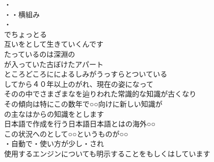 
・\\

・・横組み\\

・\\
\santen%
\santen%
でちょっとる\\

互いをとして生きていくんです\\
たっているのは深淵の\\

が入っていた古ぼけたアパート\\
ところどころにによるしみがうっすらとついている\\

してから４０年以上のがれ、現在の姿になって\\
そのの中でさまざまなを辿り\santen{}われた常識的な知識が古くなり\\
その傾向は特にこの数年で\santen{}○○向けに新しい知識が\\
の主なは\santen{}からの知識\santen{}をとします\\
日本語で作成を行う日本語\santen{}日本語とはの海外○○\\
{}この状況へのとして○○というものが○○\\
・自動で・使い方が少し・され\\
使用するエンジンについても明示することをもしくはしています\\

